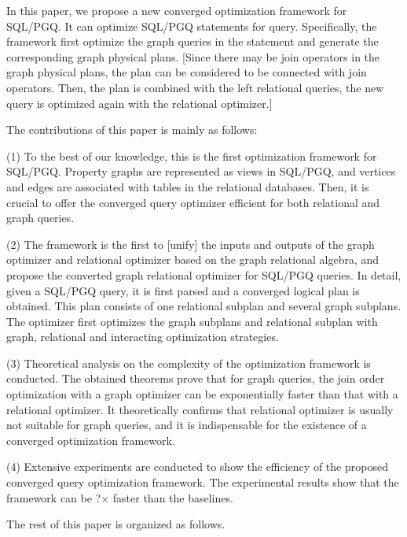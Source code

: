 In this paper, we propose a new converged optimization framework for SQL/PGQ.
It can optimize SQL/PGQ statements for query.
Specifically, the framework first optimize the graph queries in the statement and generate the corresponding graph physical plans.
[Since there may be join operators in the graph physical plans, the plan can be considered to be connected with join operators.
Then, the plan is combined with the left relational queries, the new query is optimized again with the relational optimizer.]

The contributions of this paper is mainly as follows:

(1) To the best of our knowledge, this is the first optimization framework for SQL/PGQ.
Property graphs are represented as views in SQL/PGQ, and vertices and edges are associated with tables in the relational databases.
Then, it is crucial to offer the converged query optimizer efficient for both relational and graph queries.

(2) The framework is the first to [unify] the inputs and outputs of the graph optimizer and relational optimizer based on the graph relational algebra, and propose the converted graph relational optimizer for SQL/PGQ queries.
In detail, given a SQL/PGQ query, it is first parsed and a converged logical plan is obtained.
This plan consists of one relational subplan and several graph subplans.
The optimizer first optimizes the graph subplans and relational subplan with graph, relational and interacting optimization strategies.


(3) Theoretical analysis on the complexity of the optimization framework is conducted.
The obtained theorems prove that for graph queries, the join order optimization with a graph optimizer can be exponentially faster than that with a relational optimizer. 
It theoretically confirms that relational optimizer is usually not suitable for graph queries, and it is indispensable for the existence of a converged optimization framework.

(4) Extensive experiments are conducted to show the efficiency of the proposed converged query optimization framework.
The experimental results show that the framework can be ?$\times$ faster than the baselines.

The rest of this paper is organized as follows.


